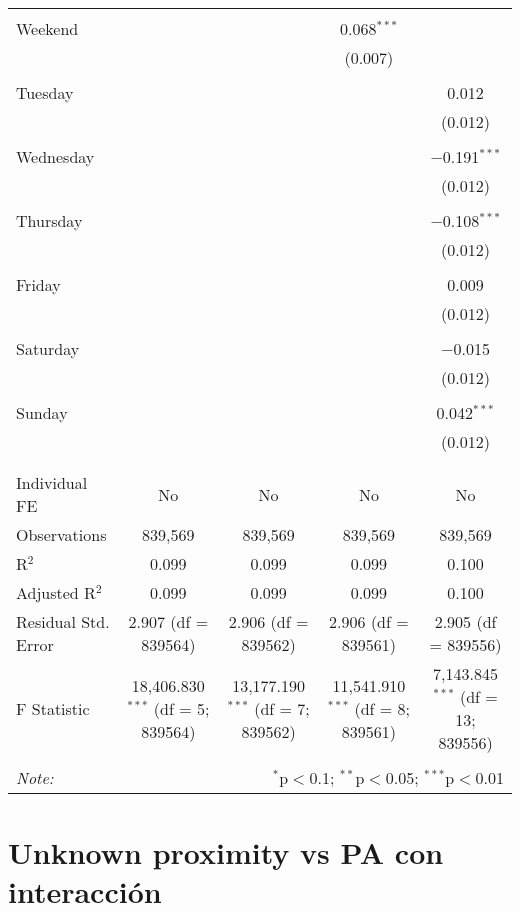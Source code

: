 \documentclass[
]{article}
\begin{document}
\begin{table}[!htbp]
{\begin{tabular}{@{\extracolsep{5pt}}lcccc}
  & & & & \\ 
 Weekend &  &  & 0.068$^{***}$ &  \\ 
  &  &  & (0.007) &  \\ 
  & & & & \\ 
 Tuesday &  &  &  & 0.012 \\ 
  &  &  &  & (0.012) \\ 
  & & & & \\ 
 Wednesday &  &  &  & $-$0.191$^{***}$ \\ 
  &  &  &  & (0.012) \\ 
  & & & & \\ 
 Thursday &  &  &  & $-$0.108$^{***}$ \\ 
  &  &  &  & (0.012) \\ 
  & & & & \\ 
 Friday &  &  &  & 0.009 \\ 
  &  &  &  & (0.012) \\ 
  & & & & \\ 
 Saturday &  &  &  & $-$0.015 \\ 
  &  &  &  & (0.012) \\ 
  & & & & \\ 
 Sunday &  &  &  & 0.042$^{***}$ \\ 
  &  &  &  & (0.012) \\ 
  & & & & \\ 
\hline \\[-1.8ex] 
Individual FE & No & No & No & No \\ 
Observations & 839,569 & 839,569 & 839,569 & 839,569 \\ 
R$^{2}$ & 0.099 & 0.099 & 0.099 & 0.100 \\ 
Adjusted R$^{2}$ & 0.099 & 0.099 & 0.099 & 0.100 \\ 
Residual Std. Error & 2.907 (df = 839564) & 2.906 (df = 839562) & 2.906 (df = 839561) & 2.905 (df = 839556) \\ 
F Statistic & 18,406.830$^{***}$ (df = 5; 839564) & 13,177.190$^{***}$ (df = 7; 839562) & 11,541.910$^{***}$ (df = 8; 839561) & 7,143.845$^{***}$ (df = 13; 839556) \\ 
\hline 
\hline \\[-1.8ex] 
\textit{Note:}  & \multicolumn{4}{r}{$^{*}$p$<$0.1; $^{**}$p$<$0.05; $^{***}$p$<$0.01} \\ 
\end{tabular}
} 
\end{table} 
\newpage
\section{Unknown proximity vs PA con interacción}
\end{document}

